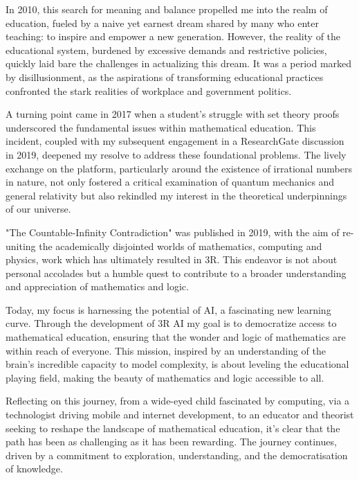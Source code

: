 \documentclass[12pt]{article}
\begin{document}
In 2010, this search for meaning and balance propelled me into the realm of education, fueled by a naive yet earnest dream shared by many who enter teaching: to inspire and empower a new generation. However, the reality of the educational system, burdened by excessive demands and restrictive policies, quickly laid bare the challenges in actualizing this dream. It was a period marked by disillusionment, as the aspirations of transforming educational practices confronted the stark realities of workplace and government politics.

A turning point came in 2017 when a student's struggle with set theory proofs underscored the fundamental issues within mathematical education. This incident, coupled with my subsequent engagement in a ResearchGate discussion in 2019, deepened my resolve to address these foundational problems. The lively exchange on the platform, particularly around the existence of irrational numbers in nature, not only fostered a critical examination of quantum mechanics and general relativity but also rekindled my interest in the theoretical underpinnings of our universe.

"The Countable-Infinity Contradiction"\cite{Ed2019xZFC} was published in 2019, with the aim of re-uniting the academically disjointed worlds of mathematics, computing and physics, work which has ultimately resulted in 3R. This endeavor is not about personal accolades but a humble quest to contribute to a broader understanding and appreciation of mathematics and logic.

Today, my focus is harnessing the potential of AI, a fascinating new learning curve. Through the development of 3R AI my goal is to democratize access to mathematical education, ensuring that the wonder and logic of mathematics are within reach of everyone. This mission, inspired by an understanding of the brain's incredible capacity to model complexity, is about leveling the educational playing field, making the beauty of mathematics and logic accessible to all.

Reflecting on this journey, from a wide-eyed child fascinated by computing, via a technologist driving mobile and internet development, to an educator and theorist seeking to reshape the landscape of mathematical education, it's clear that the path has been as challenging as it has been rewarding. The journey continues, driven by a commitment to exploration, understanding, and the democratisation of knowledge.


\end{document}

